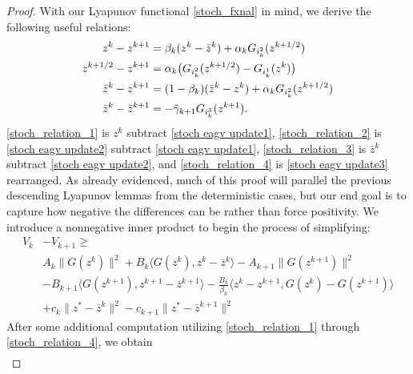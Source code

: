 \documentclass[11pt,reqno,oneside]{amsart}
\theoremstyle{definition}
\newtheorem{remark}[theorem]{Remark}
\numberwithin{equation}{section}
\begin{document}
\begin{proof}
    With our Lyapunov functional \eqref{stoch_fxnal} in mind, we derive the following useful relations:
    \begin{align}
        z^{k} - z^{k+1} &= \beta_{k}(z^{k} - \bar{z}^{k}) + \alpha_{k}G_{i_{k}^{2}}(z^{k+1/2})\label{stoch_relation_1} \\
        z^{k+1/2}-z^{k+1} &= \alpha_{k}\big{(}G_{i_{k}^{2}}(z^{k+1/2}) - G_{i_{k}^{1}}(z^{k}) \big{)}\label{stoch_relation_2} \\ 
        \bar{z}^{k}-z^{k+1} &= (1-\beta_{k})(\bar{z}^{k} - z^{k}) + \alpha_{k}G_{i_{k}^{2}}(z^{k+1/2}) \label{stoch_relation_3} \\
        \bar{z}^{k} - \bar{z}^{k+1} &= -\Tilde{\gamma}_{k+1}G_{i_{k}^{3}}(z^{k+1}) \label{stoch_relation_4}.
    \end{align}
    \eqref{stoch_relation_1} is $z^{k}$ subtract \eqref{stoch eagv update1}, \eqref{stoch_relation_2} is \eqref{stoch eagv update2} subtract \eqref{stoch eagv update1}, \eqref{stoch_relation_3} is $\bar{z}^{k}$ subtract \eqref{stoch eagv update2}, and \eqref{stoch_relation_4} is \eqref{stoch eagv update3} rearranged. 
    As already evidenced, much of this proof will parallel the previous descending Lyapunov lemmas from the deterministic cases, but our end goal is to capture how negative the differences can be rather than force positivity.
    We introduce a nonnegative inner product to begin the process of simplifying:
    \begin{align*}
        V_{k}& - V_{k+1} \geq \\
        & A_{k}\|G(z^{k})\|^{2} + B_{k}\langle G(z^{k}), z^{k} - \bar{z}^{k}\rangle - A_{k+1}\|G(z^{k+1})\|^{2} \\
        &- B_{k+1}\langle G(z^{k+1}),z^{k+1} - \bar{z}^{k+1} \rangle - \frac{B_{k}}{\beta_{k}}\langle z^{k} - z^{k+1},G(z^{k}) - G(z^{k+1}) \rangle \\
        &+ c_{k}\|z^{*} - \bar{z}^{k}\|^{2} - c_{k+1}\|z^{*} - \bar{z}^{k+1}\|^{2}
    \end{align*}
    After some additional computation utilizing \eqref{stoch_relation_1} through \eqref{stoch_relation_4}, we obtain
    \begin{align*}

\end{align*}
\end{proof}
\end{document}
